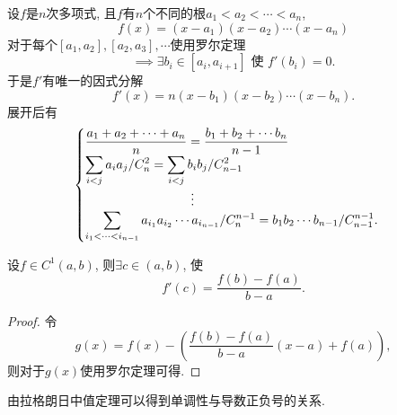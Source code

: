 \begin{example}
    设$f$是$n$次多项式, 且$f$有$n$个不同的根$a_1<a_2<\cdots<a_n$,
    \begin{equation}
      f\left( x \right) = \left( x-a_1 \right)  \left( x-a_2 \right)  \cdots \left( x-a_n \right) 
    \end{equation}
    对于每个$[a_1,a_2 ] , [a_2, a_3 ], \cdots $使用罗尔定理
    \begin{equation}
      \implies \exists b_i \in [a_i, a_{i+1}] \text{ 使 } f'\left( b_i \right) = 0.
    \end{equation}
    于是$f'$有唯一的因式分解
    \begin{equation}
      f'\left( x \right) = n \left( x-b_1 \right) \left( x-b_2 \right) \cdots \left( x- b_n \right) .
    \end{equation}
    展开后有
    \begin{equation}
      \begin{cases}
        \displaystyle \frac{a_1 + a_2 + \cdots +a_n}{n} = \frac{b_1 + b_2 + \cdots b_{n}}{n-1}
        \\
        \displaystyle \sum_{i<j} a_i a_j / C_{n}^{2} = \sum_{i<j} b_{i} b_{j} / C_{n-1}^{2}
        \\
        \makebox[6cm][c]{\vdots}
        \\
        \displaystyle \sum_{i_1 < \cdots < i_{n-1}} a_{i_1} a_{i_2} \cdots a_{i_{n-1}} / C_{n}^{n-1} = b_1 b_2 \cdots b_{n-1} / C_{n-1} ^{n-1}.
      \end{cases}
    \end{equation}
\end{example}

\begin{theorem}[Lagrange中值定理]
    设$f \in C^{1}(a,b)$, 则$\exists c\in (a,b)$, 使
    \begin{equation}
      f'\left( c \right) = \frac{f\left( b \right) - f\left( a \right) }{b - a}.
    \end{equation}
\end{theorem}
\begin{proof}
    令
    \begin{equation}
      g\left( x \right) = f\left( x \right) - \left( \frac{f\left( b \right) - f\left( a \right)}{b-a} \left( x-a \right) + f\left( a \right)  \right) ,
    \end{equation}
    则对于$g\left( x \right) $使用罗尔定理可得.
\end{proof}
由拉格朗日中值定理可以得到单调性与导数正负号的关系.

